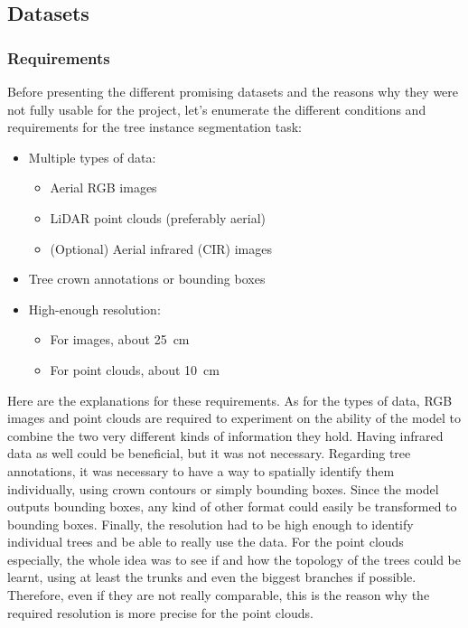 \documentclass[
  letterpaper,
  DIV=11,
  numbers=noendperiod]{scrartcl}
\providecommand{\tightlist}{%
  \setlength{\itemsep}{0pt}\setlength{\parskip}{0pt}}\usepackage{longtable,booktabs,array}
\begin{document}
\subsection{Datasets}\label{datasets}

\subsubsection{Requirements}\label{sec-sota-datasets-requirements}

Before presenting the different promising datasets and the reasons why
they were not fully usable for the project, let's enumerate the
different conditions and requirements for the tree instance segmentation
task:

\begin{itemize}
\tightlist
\item
  Multiple types of data:

  \begin{itemize}
  \tightlist
  \item
    Aerial RGB images
  \item
    LiDAR point clouds (preferably aerial)
  \item
    (Optional) Aerial infrared (CIR) images
  \end{itemize}
\item
  Tree crown annotations or bounding boxes
\item
  High-enough resolution:

  \begin{itemize}
  \tightlist
  \item
    For images, about 25~cm
  \item
    For point clouds, about 10~cm
  \end{itemize}
\end{itemize}

Here are the explanations for these requirements. As for the types of
data, RGB images and point clouds are required to experiment on the
ability of the model to combine the two very different kinds of
information they hold. Having infrared data as well could be beneficial,
but it was not necessary. Regarding tree annotations, it was necessary
to have a way to spatially identify them individually, using crown
contours or simply bounding boxes. Since the model outputs bounding
boxes, any kind of other format could easily be transformed to bounding
boxes. Finally, the resolution had to be high enough to identify
individual trees and be able to really use the data. For the point
clouds especially, the whole idea was to see if and how the topology of
the trees could be learnt, using at least the trunks and even the
biggest branches if possible. Therefore, even if they are not really
comparable, this is the reason why the required resolution is more
precise for the point clouds.
\end{document}
